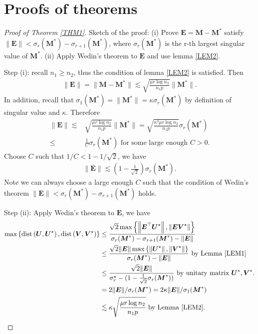 \documentclass[12pt]{article}
\theoremstyle{remark}
\newcommand{\bs}[1]{{\boldsymbol{#1}^*}}
\newcommand{\bb}[1]{{\boldsymbol {#1}}}
\begin{document}
\section{Proofs of theorems}
\begin{proof}[Proof of Theorem \ref{THM1}]
Sketch of the proof: 
(i) Prove $\bb E = \bb M - \bs M$ satisfy $\|\bb E\| < \sigma_r(\bs M) - \sigma_{r+1}(\bs M)$, where $\sigma_r(\bs M)$ is the r-th largest singular value of $\bs M$. (ii) Apply Wedin's theorem to $\bb E$ and use lemma \ref{LEM2}.

Step (i): recall $n_1 \geq n_2$, thus the condition of lemma \ref{LEM2} is satisfied. Then 
\begin{align*}
    \|\bb E\| = \|\bb M  - \bs M\| 
    \lesssim \sqrt{\frac{\mu r \log n_2}{n_1 p }} \|\bs M\|.
\end{align*}
In addition, recall that $\sigma_1(\bs M) = \|\bs M\| = \kappa \sigma_r(\bs M)$ by definition of singular value and $\kappa$.
Therefore 
\begin{align*}
    \|\bb E\| 
    \lesssim & \sqrt{\frac{\mu r \log n_2}{n_1 p }} \|\bs M\|
    = \sqrt{\frac{ \kappa^2 \mu r \log n_2}{n_1 p }} \sigma_r(\bs M) \\
    \leq & \frac{1}{C} \sigma_r(\bs M) \text{ for some large enough $C>0$}.
\end{align*}
Choose $C$ such that $1/C < 1-1/\sqrt{2}$, we have 
\begin{align*}
    \|\bb E\| 
    \lesssim 
    (1-\frac{1}{\sqrt{2}}) \sigma_r(\bs M).
\end{align*}
Note we can always choose a large enough $C$ such that the condition of Wedin's theorem $\|\bb E\| < \sigma_r(\bs M) - \sigma_{r+1}(\bs M) $ holds.

Step (ii): Apply Wedin's theorem to $\bb E$, we have 
\begin{align*}
\max \left\{\operatorname{dist}\left(\boldsymbol{U}, \boldsymbol{U}^{\star}\right), \operatorname{dist}\left(\boldsymbol{V}, \boldsymbol{V}^{\star}\right)\right\}
& \leq \frac{\sqrt{2} \max \left\{\left\|\boldsymbol{E}^{\top} \boldsymbol{U}^{\star}\right\|,\left\|\boldsymbol{E} \boldsymbol{V}^{\star}\right\|\right\}}{\sigma_r(\bs M)-\sigma_{r+1}(\bs M)-\|\boldsymbol{E}\|} \\
&  \leq \frac{\sqrt{2} \|\bb E\| \max \left\{\left\|\boldsymbol{U}^{\star}\right\|,\left\|\boldsymbol{V}^{\star}\right\|\right\}}{\sigma_r(\bs M)-\|\boldsymbol{E}\|} \text{ by Lemma \ref{LEM1}}\\
& \leq \frac{\sqrt{2} \|\bb E\|}{\sigma_r^{\star}-(1-\frac{1}{\sqrt{2}}\sigma_r(\bs M))} \text{ by unitary matrix $\bs U, \bs V$.}\\
& = 2 \|\bb E\| / \sigma_r(\bs M) 
= 2\kappa \|\bb E\| /\sigma_1(\bs M)\\
& \lesssim \kappa \sqrt{\frac{\mu r\log n_2}{n_1 p}} \text{ by Lemma \ref{LEM2}}.
\end{align*}
\end{proof}
\end{document}
